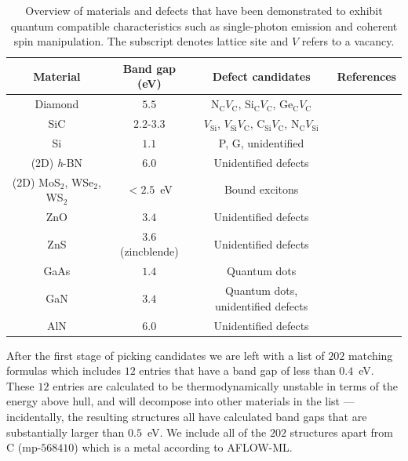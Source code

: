 \documentclass[superscriptaddress,unsortedaddress,
 amsmath,amssymb,
 aps,
]{revtex4-2}
\begin{document}
\begin{table}[b]
    \centering 
    \caption{Overview of materials and defects that have been demonstrated to exhibit quantum  compatible characteristics such as single-photon emission and coherent spin manipulation. The subscript denotes lattice site and $V$ refers to a vacancy. }
    \begin{tabular}{c|c|c|c}
    Material & Band gap (eV) & Defect candidates & References \\
    \hline
    Diamond  & $5.5$  & N$_\mathrm{C}V_\mathrm{C}$, Si$_\mathrm{C}V_\mathrm{C}$, Ge$_\mathrm{C}V_\mathrm{C}$ & \cite{Taylor2008,Balasubramanian_2009,Barclay2011,Gordon2013,Rogers_2014,Bhaskar_2018} \\ 
    SiC & $2.2$-$3.3$ & $V_\mathrm{Si}$, $V_\mathrm{Si}V_\mathrm{C}$, C$_\mathrm{Si}V_\mathrm{C}$, N$_\mathrm{C}V_\mathrm{Si}$ & \cite{Widmann2014,Christle_2015,Castelletto_2014,Zargaleh_2018}  \cite{Weber2010, Son2020, Falk2013} \\ 
    Si & $1.1$ & P, G, unidentified & \cite{Muhonen_2014,Durand_2020,Redjem2020} \\ 
    (2D) \textit{h}-BN & $6.0$ & Unidentified defects & \cite{Tran_2016,Tran_2016b,Hayee_2020} \\ 
    (2D) MoS$_2$, WSe$_2$, WS$_2$ & $<2.5$~eV & Bound excitons & \cite{Toth2019} \\
    ZnO & $3.4$ & Unidentified defects & \cite{Morfa2012} \\ 
    ZnS & $3.6$ (zincblende) & Unidentified defects & \cite{Stewart2019} \\ 
    GaAs & $1.4$ & Quantum dots & \cite{Bluhm2010} \\ 
    GaN & $3.4$ & Quantum dots, unidentified defects & \cite{Roux2017,Berhane2018} \\
    AlN & $6.0$ & Unidentified defects & \cite{Xue2020}\\
    \end{tabular}
    \label{tab:qt-materials}
\end{table} 

After the first stage of picking candidates we are left with a list of $202$ matching formulas which includes $12$ entries that have a band gap of less than $0.4$~eV. These $12$ entries are calculated to be thermodynamically unstable in terms of the energy above hull, and will decompose into other materials in the list --- incidentally, the resulting structures all have calculated band gaps that are substantially larger than $0.5$~eV. We include all of the $202$ structures apart from C (mp-$568410$) which is a metal according to AFLOW-ML. 
 
\end{document}
